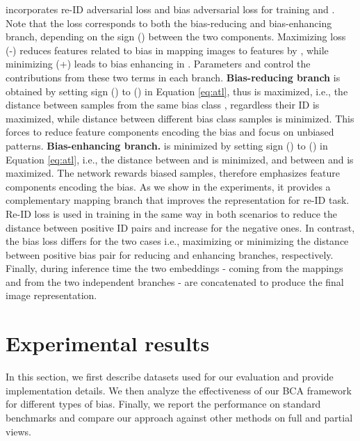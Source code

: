 \documentclass[10pt,twocolumn,letterpaper]{article}
\begin{document}
 incorporates re-ID adversarial loss  and bias adversarial loss  for training  and .  
Note that the loss corresponds to both the bias-reducing and bias-enhancing branch, depending on the sign () between the two components.
Maximizing   loss (-) reduces features related to bias in mapping images to features by , while minimizing  (+)  leads to bias enhancing in .  Parameters  and   control the contributions from these two terms in each branch.
\newline
{\noindent\textbf{Bias-reducing branch }} is obtained by setting sign () to () in Equation \ref{eq:atl},
thus  is maximized, i.e., the distance between samples from the same bias class , regardless their ID is maximized, while distance between different bias class samples  is minimized.
This forces  to reduce feature components encoding the bias and focus on unbiased patterns.
\newline
\noindent\textbf{Bias-enhancing branch.}
 is minimized by setting sign () to () in Equation \ref{eq:atl}, i.e., the distance between  and  is minimized, and between  and  is maximized. The network rewards biased samples, therefore emphasizes feature components encoding the bias. 
As we show in the experiments, it provides a complementary mapping branch  that improves the representation for re-ID task. \newline
Re-ID loss  is used in training in the same way in both scenarios to reduce the distance between positive ID pairs and increase for the negative ones.  In contrast, the bias loss  differs for the two cases i.e., maximizing or minimizing the distance between positive bias pair for reducing and enhancing branches, respectively. Finally, during inference time the two embeddings - coming from the mappings  and  from the two independent branches - are concatenated to produce the final image representation.

\section{Experimental results} \label{experimental_results}
In this section, we first describe datasets used for our evaluation and provide implementation details. We then analyze the effectiveness of our BCA framework for different types of bias. Finally, we report the performance on standard benchmarks and compare our approach against other methods on full and partial views. 
\end{document}
